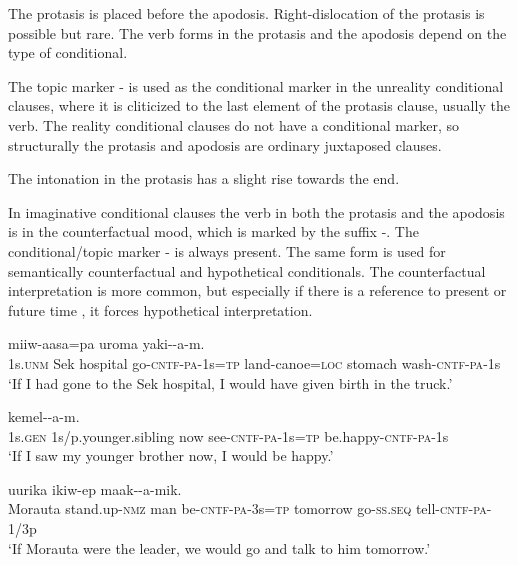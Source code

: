 The protasis is placed before the apodosis. Right-dislocation of the protasis is possible but rare. The verb forms in the protasis and the apodosis depend on the type of conditional.

The topic marker - is used as the conditional marker in the unreality conditional clauses, where it is cliticized to the last element of the protasis clause, usually the verb. The reality conditional clauses do not have a conditional marker, so structurally the protasis and apodosis are ordinary juxtaposed clauses. 

The intonation in the protasis has a slight rise towards the end.  

In imaginative conditional clauses the verb in both the protasis and the apodosis is in the counterfactual mood, which is marked by the suffix -. The conditional/topic marker - is always present. The same form is used for semantically counterfactual and hypothetical conditionals. The counterfactual interpretation  is more common, but especially if there is a reference to present  or future time , it forces hypothetical interpretation.

\ea%
\label{ex:8:x1645}
\gll [Yo  Sek  haussik  ikiw-\textstyleEmphasizedVernacularWords{ek}-a-m=\textstyleEmphasizedVernacularWords{na}]  miiw-aasa=pa uroma  yaki--a-m.\\
1s.\textsc{unm}  Sek  hospital  go-\textsc{cntf}-\textsc{pa}-1s=\textsc{tp} land-canoe=\textsc{loc} stomach  wash-\textsc{cntf}-\textsc{pa}-1s\\
\glt`If I had gone to the Sek hospital, I would have given birth in the truck.'
\z


\ea%
\label{ex:8:x1646}
\gll [Yena  aamun  aakisa  uruf-\textstyleEmphasizedVernacularWords{ek}-a-m=\textstyleEmphasizedVernacularWords{na}] kemel--a-m.\\
1s.\textsc{gen} 1s/p.younger.sibling  now  see-\textsc{cntf}-\textsc{pa}-1s=\textsc{tp} be.happy-\textsc{cntf}-\textsc{pa}-1s\\
\glt`If I saw my younger brother now, I would be happy.'
\z


\ea%
\label{ex:8:x1647}
\gll [Morauta  iimar-ow(a)  mua  ik-\textstyleEmphasizedVernacularWords{ek}-a-k=\textstyleEmphasizedVernacularWords{na},] uurika ikiw-ep  maak--a-mik.\\
Morauta  stand.up-\textsc{nmz} man be-\textsc{cntf}-\textsc{pa}-3s=\textsc{tp} tomorrow go-\textsc{ss}.\textsc{seq} tell-\textsc{cntf}-\textsc{pa}-1/3p\\
\glt`If Morauta were the leader, we would go and talk to him tomorrow.'
\z


